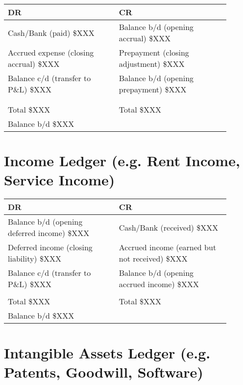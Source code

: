 \begin{tabular}{@{}p{0.45\linewidth} p{0.45\linewidth}@{}}
\textbf{DR} & \textbf{CR} \\ \midrule
Cash/Bank (paid) \hfill \$XXX & Balance b/d (opening accrual) \hfill \$XXX \\
Accrued expense (closing accrual) \hfill \$XXX & Prepayment (closing adjustment) \hfill \$XXX \\
Balance c/d (transfer to P\&L) \hfill \$XXX & Balance b/d (opening prepayment) \hfill \$XXX \\
& \\[3pt]
\multicolumn{2}{c}{\hrulefill} \\
Total \hfill \$XXX & Total \hfill \$XXX \\[6pt]
Balance b/d \hfill \$XXX & \\
\end{tabular}

\vspace{1cm}

\section*{Income Ledger (e.g. Rent Income, Service Income)}

\begin{tabular}{@{}p{0.45\linewidth} p{0.45\linewidth}@{}}
\textbf{DR} & \textbf{CR} \\ \midrule
Balance b/d (opening deferred income) \hfill \$XXX & Cash/Bank (received) \hfill \$XXX \\
Deferred income (closing liability) \hfill \$XXX & Accrued income (earned but not received) \hfill \$XXX \\
Balance c/d (transfer to P\&L) \hfill \$XXX & Balance b/d (opening accrued income) \hfill \$XXX \\[3pt]
\multicolumn{2}{c}{\hrulefill} \\
Total \hfill \$XXX & Total \hfill \$XXX \\[6pt]
Balance b/d \hfill \$XXX & \\
\end{tabular}

\vspace{1cm}

\section*{Intangible Assets Ledger (e.g. Patents, Goodwill, Software)}


